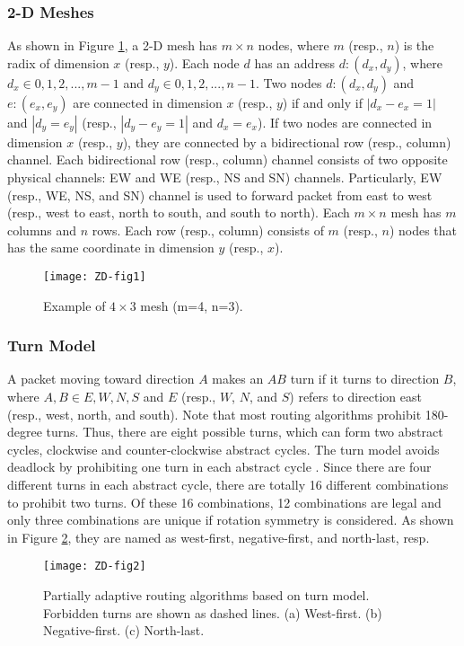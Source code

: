 \subsubsection{2-D Meshes}
As shown in Figure \ref{fig:ZD-fig1}, a 2-D mesh has $m \times n$ nodes, where $m$ (resp., $n$) is the radix of dimension $x$ (resp., $y$). Each node $d$ has an address $d : (d_{x}, d_{y})$, where $d_{x} \in {0, 1, 2, ..., m-1}$ and $d_{y} \in {0, 1, 2, ..., n-1}$. Two nodes $d: (d_{x}, d_{y})$ and $e : (e_{x}, e_{y})$ are connected in dimension $x$ (resp., $y$) if and only if $|d_{x} - e_{x}=1|$ and $|d_{y}=e_{y}|$ (resp., $|d_{y} - e_{y}=1|$ and $d_{x}=e_{x}$). If two nodes are connected in dimension $x$ (resp., $y$), they are connected by a bidirectional row (resp., column) channel. Each bidirectional row (resp., column) channel consists of two opposite physical channels: EW and WE (resp., NS and SN) channels. Particularly, EW (resp., WE, NS, and SN) channel is used to forward packet from east to west (resp., west to east, north to south, and south to north). Each $m \times n$ mesh has $m$ columns and $n$ rows. Each row (resp., column) consists of $m$ (resp., $n$) nodes that has the same coordinate in dimension $y$ (resp., $x$).

\begin{figure}[h]
    \centering
        \texttt{[image: ZD-fig1]}
          \caption{Example of $4 \times 3$ mesh (m=4, n=3).}
        \label{fig:ZD-fig1}
\end{figure}

\subsubsection{Turn Model}
A packet moving toward direction $A$ makes an $AB$ turn if it turns to direction $B$, where $A, B \in {E, W, N, S}$ and $E$ (resp., $W$, $N$, and $S$) refers to direction east (resp., west, north, and south). Note that most routing algorithms prohibit 180-degree turns. Thus, there are eight possible turns, which can form two abstract cycles, clockwise and counter-clockwise abstract cycles. The turn model avoids deadlock by prohibiting one turn in each abstract cycle \cite{glass1992turn}. Since there are four different turns in each abstract cycle, there are totally 16 different combinations to prohibit two turns. Of these 16 combinations, 12 combinations are legal and only three combinations are unique if rotation symmetry is considered. As shown in Figure \ref{fig:ZD-fig2}, they are named as west-first, negative-first, and north-last, resp. 
\begin{figure}[h]
    \centering
        \texttt{[image: ZD-fig2]}
          \caption{Partially adaptive routing algorithms based on turn model. Forbidden turns are shown as dashed lines. (a) West-first. (b) Negative-first. (c) North-last.}
        \label{fig:ZD-fig2}
\end{figure}


